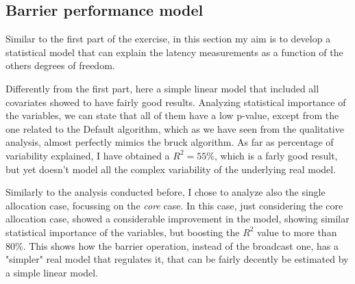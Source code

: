 \documentclass{article}
\begin{document}
	\subsection{Barrier performance model}
	
	Similar to the first part of the exercise, in this section my aim is to develop a statistical model that can explain the latency measurements as a function of the others degrees of freedom.
	
	Differently from the first part, here a simple linear model that included all covariates showed to have fairly good results.
	Analyzing statistical importance of the variables, we can state that all of them have a low p-value, except from the one related to the Default algorithm, which as we have seen from the qualitative analysis, almost perfectly mimics the bruck algorithm.
	As far as percentage of variability explained, I have obtained a $R^2=55\%$, which is a farly good result, but yet doesn't model all the complex variability of the underlying real model.
	
	Similarly to the analysis conducted before, I chose to analyze also the single allocation case, focussing on the \textit{core} case.
	In this case, just considering the core allocation case, showed a considerable improvement in the model, showing similar statistical importance of the variables, but boosting the $R^2$ value to more than $80\%$. This shows how the barrier operation, instead of the broadcast one, has a "simpler" real model that regulates it, that can be fairly decently be estimated by a simple linear model.
	
	 
\end{document}
